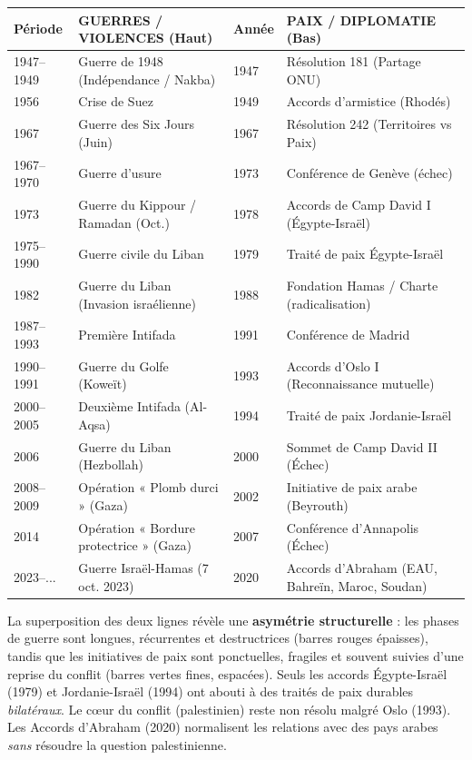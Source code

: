 \documentclass[11pt]{article}
\begin{document}
\begin{center}
\begin{tabularx}{\linewidth}{|l|X|l|X|}\hline
\textbf{Période} & \textbf{GUERRES / VIOLENCES (Haut)} & \textbf{Année} & \textbf{PAIX / DIPLOMATIE (Bas)} \\ \hline
1947–1949 & Guerre de 1948 (Indépendance / Nakba) & 1947 & Résolution 181 (Partage ONU) \\ \hline
1956 & Crise de Suez & 1949 & Accords d'armistice (Rhodés) \\ \hline
1967 & Guerre des Six Jours (Juin) & 1967 & Résolution 242 (Territoires vs Paix) \\ \hline
1967–1970 & Guerre d'usure & 1973 & Conférence de Genève (échec) \\ \hline
1973 & Guerre du Kippour / Ramadan (Oct.) & 1978 & Accords de Camp David I (Égypte-Israël) \\ \hline
1975–1990 & Guerre civile du Liban & 1979 & Traité de paix Égypte-Israël \\ \hline
1982 & Guerre du Liban (Invasion israélienne) & 1988 & Fondation Hamas / Charte (radicalisation) \\ \hline
1987–1993 & Première Intifada & 1991 & Conférence de Madrid \\ \hline
1990–1991 & Guerre du Golfe (Koweït) & 1993 & Accords d'Oslo I (Reconnaissance mutuelle) \\ \hline
2000–2005 & Deuxième Intifada (Al-Aqsa) & 1994 & Traité de paix Jordanie-Israël \\ \hline
2006 & Guerre du Liban (Hezbollah) & 2000 & Sommet de Camp David II (Échec) \\ \hline
2008–2009 & Opération « Plomb durci » (Gaza) & 2002 & Initiative de paix arabe (Beyrouth) \\ \hline
2014 & Opération « Bordure protectrice » (Gaza) & 2007 & Conférence d'Annapolis (Échec) \\ \hline
2023–... & Guerre Israël-Hamas (7 oct. 2023) & 2020 & Accords d'Abraham (EAU, Bahreïn, Maroc, Soudan) \\ \hline
\end{tabularx}
\end{center}

\begin{aretenir}
La superposition des deux lignes révèle une \textbf{asymétrie structurelle} : les phases de guerre sont longues, récurrentes et destructrices (barres rouges épaisses), tandis que les initiatives de paix sont ponctuelles, fragiles et souvent suivies d'une reprise du conflit (barres vertes fines, espacées). Seuls les accords Égypte-Israël (1979) et Jordanie-Israël (1994) ont abouti à des traités de paix durables \textit{bilatéraux}. Le cœur du conflit (palestinien) reste non résolu malgré Oslo (1993). Les Accords d'Abraham (2020) normalisent les relations avec des pays arabes \textit{sans} résoudre la question palestinienne.
\end{aretenir}
\end{document}
